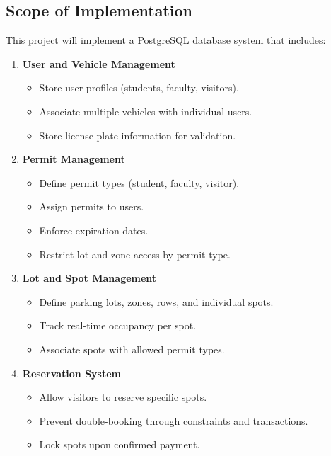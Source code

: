 \documentclass[12pt]{report}
\begin{document}
\subsection{Scope of Implementation}

This project will implement a PostgreSQL database system that includes:

\begin{enumerate}
    \item \textbf{User and Vehicle Management}
    \begin{itemize}
        \item Store user profiles (students, faculty, visitors).
        \item Associate multiple vehicles with individual users.
        \item Store license plate information for validation.
    \end{itemize}

    \item \textbf{Permit Management}
    \begin{itemize}
        \item Define permit types (student, faculty, visitor).
        \item Assign permits to users.
        \item Enforce expiration dates.
        \item Restrict lot and zone access by permit type.
    \end{itemize}

    \item \textbf{Lot and Spot Management}
    \begin{itemize}
        \item Define parking lots, zones, rows, and individual spots.
        \item Track real-time occupancy per spot.
        \item Associate spots with allowed permit types.
    \end{itemize}

    \item \textbf{Reservation System}
    \begin{itemize}
        \item Allow visitors to reserve specific spots.
        \item Prevent double-booking through constraints and transactions.
        \item Lock spots upon confirmed payment.
    \end{itemize}


\end{enumerate}
\end{document}
